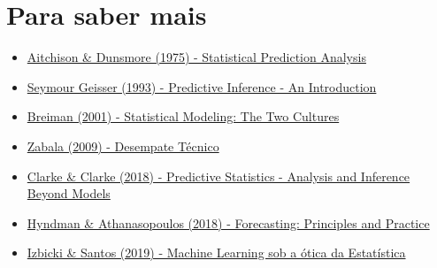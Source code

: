\documentclass{beamer}
\begin{document}
\section{Para saber mais}
\begin{frame}{\secname}
    	\begin{itemize}
    	\item \href{https://doi.org/10.1017/CBO9780511569647}{Aitchison \& Dunsmore (1975) - Statistical Prediction Analysis}
    	\item \href{https://doi.org/10.1201/9780203742310}{Seymour Geisser (1993) - Predictive Inference - An Introduction}
    	\item \href{https://projecteuclid.org/euclid.ss/1009213726}{Breiman (2001) - Statistical Modeling: The Two Cultures}
    	\item \href{http://www.estatisticaclassica.com/jurimetria/zabala2009.pdf}{Zabala (2009) - Desempate Técnico}
    	\item \href{https://doi.org/10.1017/9781139236003}{Clarke \& Clarke (2018) - Predictive Statistics - Analysis and Inference Beyond Models}
    	\item \href{https://otexts.com/fpp2/}{Hyndman \& Athanasopoulos (2018) - Forecasting: Principles and Practice}
    	\item \href{http://www.rizbicki.ufscar.br/sml.pdf}{Izbicki \& Santos (2019) - Machine Learning sob a ótica da Estatística}
	\end{itemize}
\end{frame}
\end{document}
